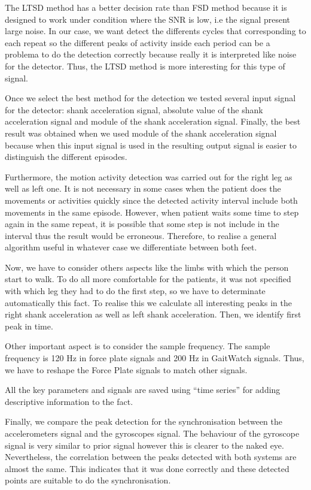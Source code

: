 The LTSD method has a better decision rate than FSD method because it is designed to work under condition where the SNR is low, i.e the signal present large noise\cite{A.Olivares2013}. In our case, we want detect the differents cycles that corresponding to each repeat so the different peaks of activity inside each period can be a problema to do the detection correctly because really it is interpreted like noise for the detector. Thus, the LTSD method is more interesting for this type of signal.

Once we select the best method for the detection we tested several input signal for the detector: shank acceleration signal, absolute value of the shank acceleration signal and module of the shank acceleration signal. Finally, the best result was obtained when we used module of the shank acceleration signal because when this input signal is used in the resulting output signal is easier to distinguish the different episodes.

Furthermore, the motion activity detection was carried out for the right leg as well as left one. It is not necessary in some cases when the patient does the movements or activities quickly since the detected activity interval  include both movements in the same episode. However, when patient waits some time to step again in the same repeat, it is possible that some step is not  include in the interval thus the result would be erroneous. Therefore, to realise a general algorithm useful in whatever case we differentiate between both feet.


Now, we have to consider others aspects like the limbs with which the person start to walk. To do all more comfortable for the patients, it was not specified with which leg they had to do the first step, so we have to determinate automatically this fact. To realise this we calculate all interesting peaks in the right shank acceleration as well as left shank acceleration. Then, we identify first peak in time.

Other important aspect is to consider the sample frequency. The sample frequency is 120 Hz in force plate signals and 200 Hz in GaitWatch signals. Thus, we have to reshape the Force Plate signals to match other signals.

All the key parameters and signals are saved using “time series”  for adding descriptive information to the fact.

Finally, we compare the peak detection for the synchronisation between the accelerometers signal and the gyroscopes signal. The behaviour of the gyroscope signal is very similar to prior signal however this is clearer to the naked eye.
Nevertheless, the correlation between the peaks detected with both systems are almost the same. This indicates that it was done correctly and these detected points are suitable to do the synchronisation.

